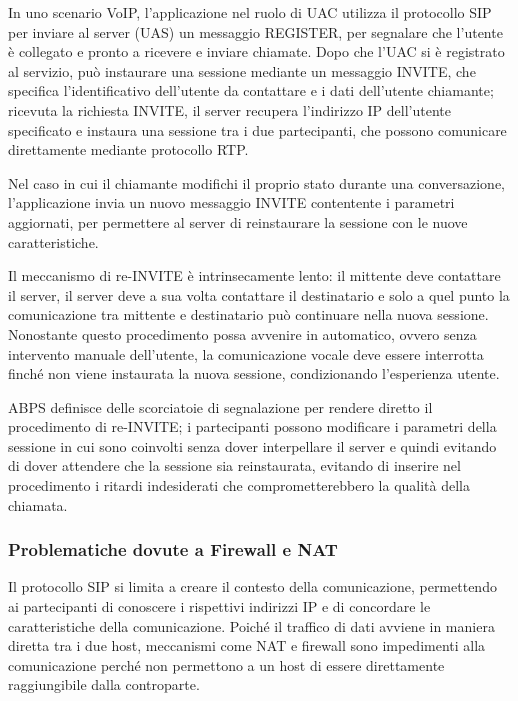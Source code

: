 \documentclass[12pt,a4paper,openright,twoside]{book}
\begin{document}
In uno scenario VoIP, l'applicazione nel ruolo di UAC utilizza il
protocollo SIP per inviare al server (UAS) un messaggio REGISTER, per
segnalare che l'utente è collegato e pronto a ricevere e inviare
chiamate. Dopo che l'UAC si è registrato al servizio, può instaurare
una sessione mediante un messaggio INVITE, che specifica
l'identificativo dell'utente da contattare e i dati dell'utente
chiamante; ricevuta la richiesta INVITE, il server recupera
l'indirizzo IP dell'utente specificato e instaura una sessione tra i
due partecipanti, che possono comunicare direttamente mediante
protocollo RTP.

Nel caso in cui il chiamante modifichi il proprio stato durante una
conversazione, l'applicazione invia un nuovo messaggio INVITE
contentente i parametri aggiornati, per permettere al server di
reinstaurare la sessione con le nuove caratteristiche.

Il meccanismo di re-INVITE è intrinsecamente lento: il mittente deve
contattare il server, il server deve a sua volta contattare il
destinatario e solo a quel punto la comunicazione tra mittente e
destinatario può continuare nella nuova sessione. Nonostante questo
procedimento possa avvenire in automatico, ovvero senza intervento
manuale dell'utente, la comunicazione vocale deve essere interrotta
finché non viene instaurata la nuova sessione, condizionando
l'esperienza utente.

ABPS definisce delle scorciatoie di segnalazione per rendere diretto
il procedimento di re-INVITE; i partecipanti possono modificare i
parametri della sessione in cui sono coinvolti senza dover
interpellare il server e quindi evitando di dover attendere che la
sessione sia reinstaurata, evitando di inserire nel procedimento i
ritardi indesiderati che comprometterebbero la qualità della chiamata.

\subsubsection{Problematiche dovute a Firewall e NAT}

Il protocollo SIP si limita a creare il contesto della comunicazione,
permettendo ai partecipanti di conoscere i rispettivi indirizzi IP e
di concordare le caratteristiche della comunicazione. Poiché il
traffico di dati avviene in maniera diretta tra i due host, meccanismi
come NAT e firewall sono impedimenti alla comunicazione perché non
permettono a un host di essere direttamente raggiungibile dalla
controparte.
\end{document}
